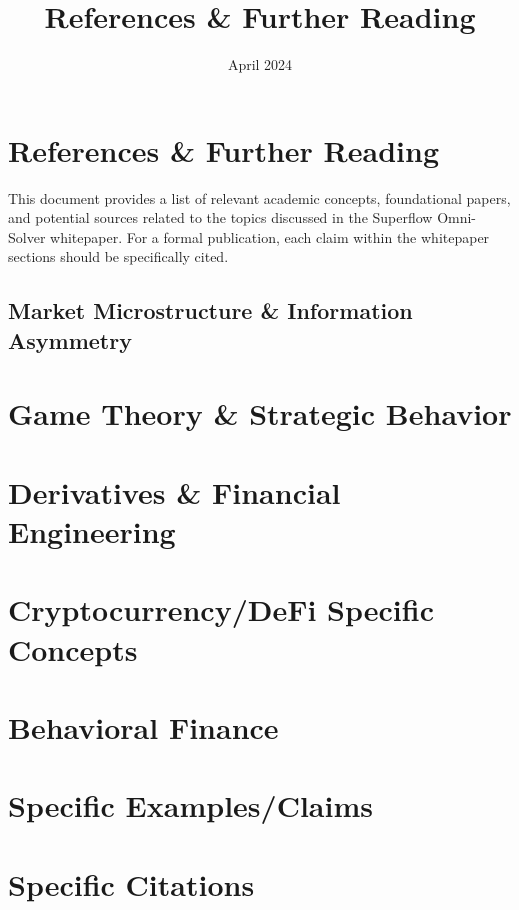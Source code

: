 \documentclass{article}
\title{References & Further Reading}
\date{April 2024}
\begin{document}
\section{References & Further Reading}
This document provides a list of relevant academic concepts, foundational papers, and potential sources related to the topics discussed in the Superflow Omni-Solver whitepaper. For a formal publication, each claim within the whitepaper sections should be specifically cited.

\subsection{Market Microstructure & Information Asymmetry}

\section{Game Theory & Strategic Behavior}

\section{Derivatives & Financial Engineering}

\section{Cryptocurrency/DeFi Specific Concepts}

\section{Behavioral Finance}

\section{Specific Examples/Claims}

\section{Specific Citations}
\end{document}
